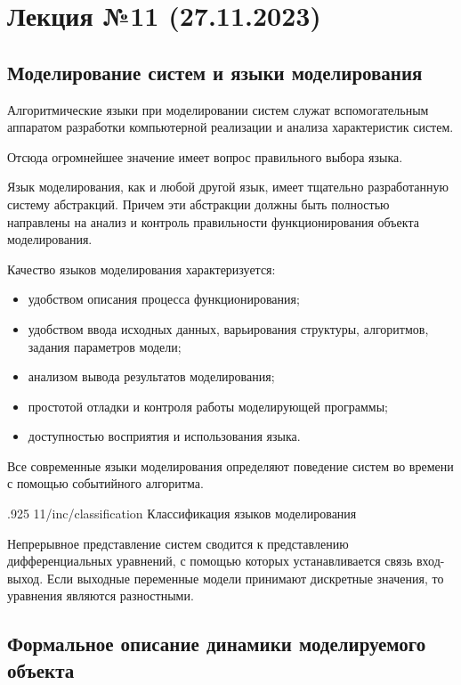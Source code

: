 \section{Лекция №11 (27.11.2023)}

\subsection{Моделирование систем и языки моделирования}

Алгоритмические языки при моделировании систем служат вспомогательным аппаратом разработки компьютерной реализации и анализа характеристик систем.

Отсюда огромнейшее значение имеет вопрос правильного выбора языка.

Язык моделирования, как и любой другой язык, имеет тщательно разработанную систему абстракций. Причем эти абстракции должны быть полностью направлены на анализ и контроль правильности функционирования объекта моделирования.

Качество языков моделирования характеризуется:

\begin{itemize}
    \item удобством описания процесса функционирования;
    \item удобством ввода исходных данных, варьирования структуры, алгоритмов, задания параметров модели;
    \item анализом вывода результатов моделирования;
    \item простотой отладки и контроля работы моделирующей программы;
    \item доступностью восприятия и использования языка.
\end{itemize}

Все современные языки моделирования определяют поведение систем во времени с помощью событийного алгоритма.

\image
{.925\textwidth}
{11/inc/classification}
{Классификация языков моделирования}

Непрерывное представление систем сводится к представлению дифференциальных уравнений, с помощью которых устанавливается связь вход-выход. Если выходные переменные модели принимают дискретные значения, то уравнения являются разностными.

\subsection{Формальное описание динамики моделируемого объекта}

